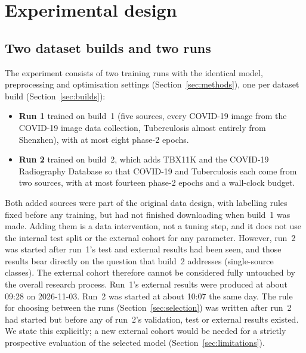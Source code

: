 \section{Experimental design}
\label{sec:design}

\subsection{Two dataset builds and two runs}
The experiment consists of two training runs with the identical model, preprocessing and optimisation settings (Section~\ref{sec:methods}), one per dataset build (Section~\ref{sec:builds}):
\begin{itemize}
\item \textbf{Run 1} trained on build~1 (five sources, every COVID-19 image from the COVID-19 image data collection, Tuberculosis almost entirely from Shenzhen), with at most eight phase-2 epochs.
\item \textbf{Run 2} trained on build~2, which adds TBX11K and the COVID-19 Radiography Database so that COVID-19 and Tuberculosis each come from two sources, with at most fourteen phase-2 epochs and a wall-clock budget.
\end{itemize}
Both added sources were part of the original data design, with labelling rules fixed before any training, but had not finished downloading when build~1 was made. Adding them is a data intervention, not a tuning step, and it does not use the internal test split or the external cohort for any parameter. However, run~2 was started after run~1's test and external results had been seen, and those results bear directly on the question that build~2 addresses (single-source classes). The external cohort therefore cannot be considered fully untouched by the overall research process. Run~1's external results were produced at about 09:28 on 2026-11-03. Run~2 was started at about 10:07 the same day. The rule for choosing between the runs (Section~\ref{sec:selection}) was written after run~2 had started but before any of run~2's validation, test or external results existed. We state this explicitly; a new external cohort would be needed for a strictly prospective evaluation of the selected model (Section~\ref{sec:limitations}).

